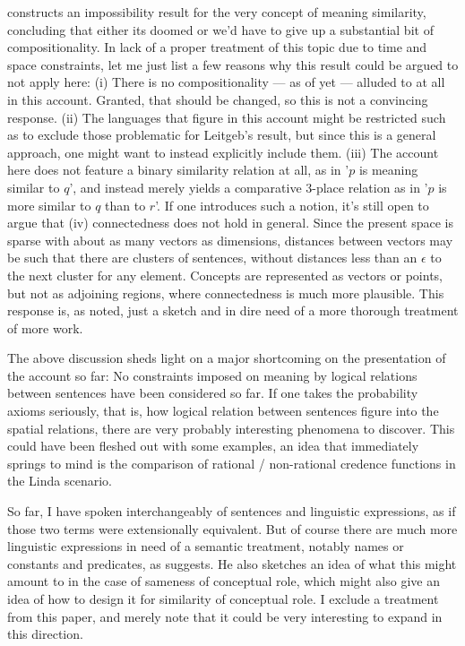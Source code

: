 \documentclass[11pt, a4paper]{scrartcl}
\begin{document}
\textcite{Leitgeb2008-LEIAIR} constructs an impossibility result for the very concept of meaning similarity, concluding that either its doomed or we'd have to give up a substantial bit of compositionality. In lack of a proper treatment of this topic due to time and space constraints, let me just list a few reasons why this result could be argued to not apply here: (i) There is no compositionality --- as of yet --- alluded to at all in this account. Granted, that should be changed, so this is not a convincing response. (ii) The languages that figure in this account might be restricted such as to exclude those problematic for Leitgeb's result, but since this is a general approach, one might want to instead explicitly include them. (iii) The account here does not feature a binary similarity relation at all, as in '$p$ is meaning similar to $q$', and instead merely yields a comparative 3-place relation as in '$p$ is more similar to $q$ than to $r$'. If one introduces such a notion, it's still open to argue that (iv) connectedness does not hold in general. Since the present space is sparse with about as many vectors as dimensions, distances between vectors may be such that there are clusters of sentences, without distances less than an $\epsilon$ to the next cluster for any element. Concepts are represented as vectors or points, but not as adjoining regions, where connectedness is much more plausible. This response is, as noted, just a sketch and in dire need of a more thorough treatment of more work.

The above discussion sheds light on a major shortcoming on the presentation of the account so far: No constraints imposed on meaning by logical relations between sentences have been considered so far. If one takes the probability axioms seriously, that is, how logical relation between sentences figure into the spatial relations, there are very probably interesting phenomena to discover. This could have been fleshed out with some examples, an idea that immediately springs to mind is the comparison of rational / non-rational credence functions in the Linda scenario.

So far, I have spoken interchangeably of sentences and linguistic expressions, as if those two terms were extensionally equivalent. But of course there are much more linguistic expressions in need of a semantic treatment, notably names or constants and predicates, as \textcite[396]{Field1977} suggests. He also sketches an idea of what this might amount to in the case of sameness of conceptual role, which might also give an idea of how to design it for similarity of conceptual role. I exclude a treatment from this paper, and merely note that it could be very interesting to expand in this direction.
\end{document}
